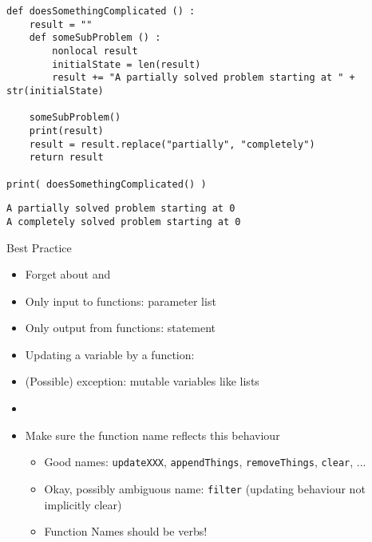 
\begin{frame}[fragile]
%
\begin{codebox}
\begin{verbatim}
def doesSomethingComplicated () :
    result = ""
    def someSubProblem () :
        nonlocal result
        initialState = len(result)
        result += "A partially solved problem starting at " + str(initialState)
    
    someSubProblem()
    print(result)
    result = result.replace("partially", "completely")
    return result

print( doesSomethingComplicated() )
\end{verbatim}
\end{codebox}
%
\begin{cmdbox}
\begin{verbatim}
A partially solved problem starting at 0
A completely solved problem starting at 0
\end{verbatim}
\end{cmdbox}
%
\end{frame}


\begin{frame}{Best Practice}
%
\begin{itemize}
\item Forget about  and 
\item Only input to functions: parameter list
\item Only output from functions:  statement
\item Updating a variable by a function: 
\item (Possible) exception: mutable variables like lists
\item {}
\item Make sure the function name reflects this behaviour
	\begin{itemize}
	\item Good names: \texttt{updateXXX}, \texttt{appendThings}, \texttt{removeThings}, \texttt{clear}, ...
	\item Okay, possibly ambiguous name: \texttt{filter} (updating behaviour not implicitly clear)
	\item[\Thus] Function Names should be verbs!
	\end{itemize}
\end{itemize}
%
\end{frame}

